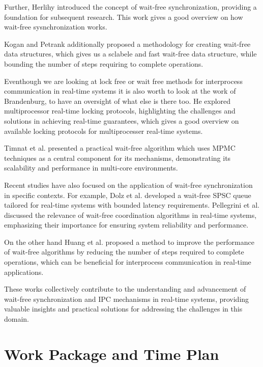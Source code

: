 \documentclass[ a4paper,
                toc=bibliography
              ]{scrartcl}
\begin{document}
Further, Herlihy introduced the concept of wait-free synchronization, providing a foundation for subsequent research. This work gives a good overview on how wait-free sysnchronization works. \cite{herlihy1991wait}

Kogan and Petrank \cite{kogan2012methodology} additionally proposed a methodology for creating wait-free data structures, which gives us a sclabele and fast wait-free data structure, while bounding the number of steps requiring to complete operations.

Eventhough we are looking at lock free or wait free methods for interprocess communication in real-time systems it is also worth to look at the work of Brandenburg, to have an oversight of what else is there too. He explored multiprocessor real-time locking protocols, highlighting the challenges and solutions in achieving real-time guarantees, which gives a good overview on available locking protocols for multiprocesser real-time systems. \cite{brandenburg2019multiprocessorrealtimelockingprotocols}

Timnat et al. \cite{timnat2014practical} presented a practical wait-free algorithm which uses MPMC techniques as a central component for its mechanisms, demonstrating its scalability and performance in multi-core environments.

Recent studies have also focused on the application of wait-free synchronization in specific contexts. For example, Dolz et al. \cite{dolz2016SPSC} developed a wait-free SPSC queue tailored for real-time systems with bounded latency requirements. Pellegrini et al. \cite{pellegrini2020relevancewaitfreecoordinationalgorithms} discussed the relevance of wait-free coordination algorithms in real-time systems, emphasizing their importance for ensuring system reliability and performance.

On the other hand Huang et al. \cite{huang2002improvingWaitFree} proposed a method to improve the performance of wait-free algorithms by reducing the number of steps required to complete operations, which can be beneficial for interprocess communication in real-time applications.

These works collectively contribute to the understanding and advancement of wait-free synchronization and IPC mechanisms in real-time systems, providing valuable insights and practical solutions for addressing the challenges in this domain.

\section{Work Package and Time Plan}
\end{document}
